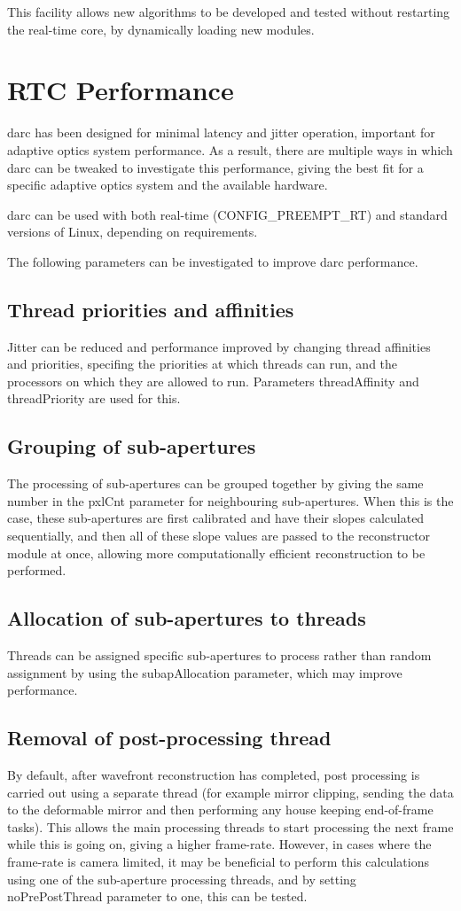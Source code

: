 \documentclass[a4,10pt]{article}
\begin{document}
This facility allows new algorithms to be developed and tested without
restarting the real-time core, by dynamically loading new modules.


\section{RTC Performance}
darc has been designed for minimal latency and jitter operation, important for
adaptive optics system performance.  As a result, there are multiple
ways in which darc can be tweaked to investigate this performance,
giving the best fit for a specific adaptive optics system and the
available hardware.

darc can be used with both real-time (CONFIG\_PREEMPT\_RT) and
standard versions of Linux, depending on requirements.

The following parameters can be investigated to improve darc performance.

\subsection{Thread priorities and affinities}
Jitter can be reduced and performance improved by changing thread
affinities and priorities, specifing the priorities at which threads
can run, and the processors on which they are allowed to run.
Parameters threadAffinity and threadPriority are used for this.

\subsection{Grouping of sub-apertures}
The processing of sub-apertures can be grouped together by giving the
same number in the pxlCnt parameter for neighbouring sub-apertures.
When this is the case, these sub-apertures are first calibrated and
have their slopes calculated sequentially, and then all of these slope
values are passed to the reconstructor module at once, allowing more
computationally efficient reconstruction to be performed. 

\subsection{Allocation of sub-apertures to threads}
Threads can be assigned specific sub-apertures to process rather than
random assignment by using the subapAllocation parameter, which may
improve performance.

\subsection{Removal of post-processing thread}
By default, after wavefront reconstruction has completed, post
processing is carried out using a separate thread (for example mirror
clipping, sending the data to the deformable mirror and then
performing any house keeping end-of-frame tasks).  This allows the
main processing threads to start processing the next frame while this
is going on, giving a higher frame-rate.  However, in cases where the
frame-rate is camera limited, it may be beneficial to perform this
calculations using one of the sub-aperture processing threads, and by
setting noPrePostThread parameter to one, this can be tested.
\end{document}

